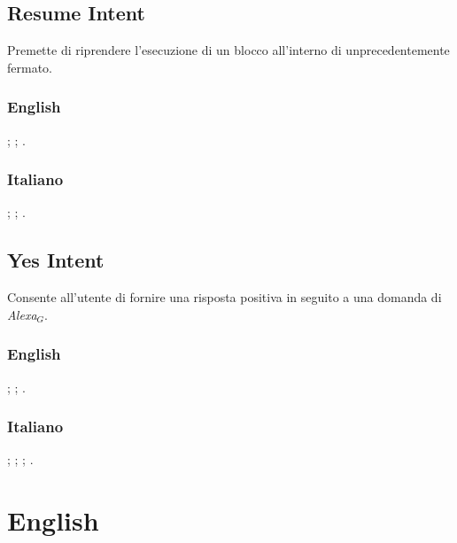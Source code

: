 \subsection{Resume Intent}
Premette di riprendere l'esecuzione di un blocco all'interno di unprecedentemente fermato.
\subsubsection{English}
\begin{itemize}
	
	;
	;
	.
	
\end{itemize}

\subsubsection{Italiano}
\begin{itemize}
	;
	;
	.
	
\end{itemize}



\subsection{Yes Intent}
Consente all'utente di fornire una risposta positiva in seguito a una domanda di \textit{Alexa$_{G}$}.
\subsubsection{English}
\begin{itemize}
	
	;
	;
	.
	
\end{itemize}

\subsubsection{Italiano}
\begin{itemize}
	;
	;
	;
	.		
\end{itemize}

\section{English}
